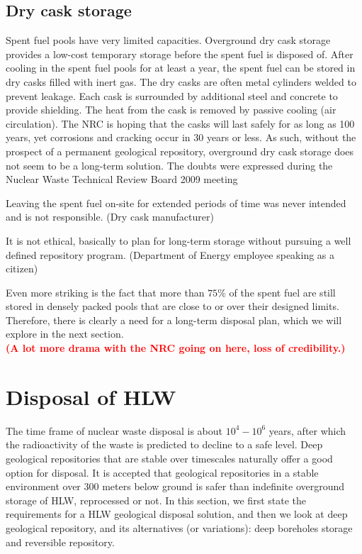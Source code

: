 \documentclass[nofootinbib,preprint,aip,pra]{revtex4-1}
\newcommand{\red}[1]{\textcolor{red}{\bf #1}}
\begin{document}
    \subsection{Dry cask storage}
    Spent fuel pools have very limited capacities. 
    Overground dry cask storage provides a low-cost temporary storage before the spent fuel is disposed of.
    After cooling in the spent fuel pools for at least a year, the spent fuel can be stored in dry casks filled with inert gas. 
The dry casks are often metal cylinders welded to prevent leakage. Each cask is surrounded by
    additional steel and concrete to provide shielding.
    The heat from the cask is removed by passive
    cooling (air circulation). The NRC is hoping that the casks will
    last safely for as long as 100 years, yet corrosions and cracking occur in 30 years
    or less.\cite{aa12} As such, without the prospect of a permanent geological repository,
    overground dry cask storage does not seem to be a long-term solution. The doubts were expressed
    during the Nuclear Waste Technical Review Board 2009 meeting \cite{nwtb09, aa12}
    \begin{displayquote}
    Leaving the spent fuel on-site for extended periods of time was never intended and is not
    responsible. (Dry cask manufacturer)

    It is not ethical, basically to plan for long-term storage without pursuing a well defined repository
    program. (Department of Energy employee speaking as a citizen)
    \end{displayquote}
    Even more striking is the fact that more than $75\%$ of the spent fuel are still stored in densely
    packed pools
    that are close to or over their designed limits.\cite{a11,aa12}
    Therefore, there is clearly a need for a long-term disposal plan, which we will explore in
    the next section.\\
    \red{(A lot more drama with the NRC going on here, loss of credibility.)}

\section{Disposal of HLW}
\label{sec:disposal}
    The time frame of nuclear waste disposal is about $10^4-10^6$ years, after which the radioactivity
    of the waste is predicted to decline to a safe level.
    Deep geological repositories that are stable over timescales naturally offer a good option for disposal.
    It is accepted that geological repositories in a stable environment over 300 meters below ground
    is safer than indefinite overground storage of HLW, reprocessed or not.\cite{fmr11}
    In this section, we first state the requirements for a HLW geological disposal solution, and then
    we look at  deep geological repository, and its alternatives (or variations): deep boreholes storage
    and reversible repository.
\end{document}
